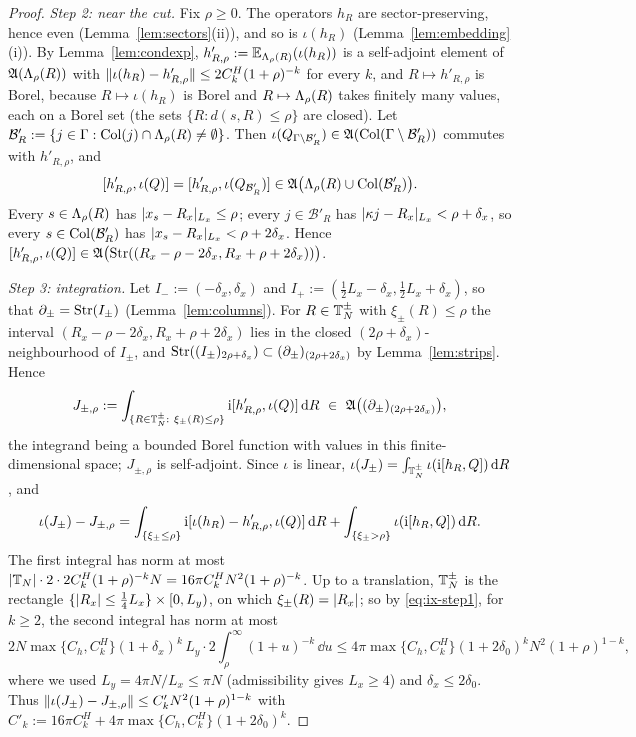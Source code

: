 \begin{proof}
\emph{Step 2: near the cut.} Fix $\rho\ge0$. The operators $h_R$ are sector-preserving, hence even
(Lemma~\ref{lem:sectors}(ii)), and so is $\iota(h_R)$ (Lemma~\ref{lem:embedding}(i)). By Lemma~\ref{lem:condexp},
$h'_{R,\rho}:=\mathbb{E}_{\Lambda_{\rho}(R)}(\iota(h_R))$ is a self-adjoint element of $\mathfrak{A}(\Lambda_{\rho}(R))$ with
$\lVert\iota(h_R)-h'_{R,\rho}\rVert\le2C^H_k(1+\rho)^{-k}$ for every $k$, and $R\mapsto h'_{R,\rho}$ is Borel, because
$R\mapsto\iota(h_R)$ is Borel and $R\mapsto\Lambda_{\rho}(R)$ takes finitely many values, each on a Borel set (the sets
$\{R:d(s,R)\le\rho\}$ are closed). Let $\mathcal B'_R:=\{j\in\Gamma:\mathrm{Col}(j)\cap\Lambda_{\rho}(R)\ne\emptyset\}$. Then
$\iota(Q_{\Gamma\setminus\mathcal B'_R})\in\mathfrak{A}(\mathrm{Col}(\Gamma\setminus\mathcal B'_R))$ commutes with $h'_{R,\rho}$, and
\[
[h'_{R,\rho},\iota(Q)]=[h'_{R,\rho},\iota(Q_{\mathcal B'_R})]\in\mathfrak{A}\bigl(\Lambda_{\rho}(R)\cup\mathrm{Col}(\mathcal B'_R)\bigr).
\]
Every $s\in\Lambda_{\rho}(R)$ has $\lvert x_s-R_x\rvert_{L_x}\le\rho$; every $j\in\mathcal B'_R$ has $\lvert\kappa j-R_x\rvert_{L_x}<\rho+\delta_x$,
so every $s\in\mathrm{Col}(\mathcal B'_R)$ has $\lvert x_s-R_x\rvert_{L_x}<\rho+2\delta_x$. Hence
$[h'_{R,\rho},\iota(Q)]\in\mathfrak{A}\bigl(\mathrm{Str}((R_x-\rho-2\delta_x,R_x+\rho+2\delta_x))\bigr)$.

\emph{Step 3: integration.} Let $I_-:=(-\delta_x,\delta_x)$ and $I_+:=(\frac12L_x-\delta_x,\frac12L_x+\delta_x)$, so that
$\partial_\pm=\mathrm{Str}(I_\pm)$ (Lemma~\ref{lem:columns}). For $R\in\mathbb{T}_N^\pm$ with $\xi_\pm(R)\le\rho$ the interval
$(R_x-\rho-2\delta_x,R_x+\rho+2\delta_x)$ lies in the closed $(2\rho+\delta_x)$-neighbourhood of $I_\pm$, and
$\mathrm{Str}((I_\pm)_{2\rho+\delta_x})\subset(\partial_\pm)_{(2\rho+2\delta_x)}$ by Lemma~\ref{lem:strips}. Hence
\[
J_{\pm,\rho}:=\int_{\{R\in\Tor_N^\pm:\ \xi_\pm(R)\le\rho\}}\iu[h'_{R,\rho},\iota(Q)]\,\dd R\ \in\ \Alg\bigl(\fat{(\partial_\pm)}{2\rho+2\delta_x}\bigr),
\]
the integrand being a bounded Borel function with values in this finite-dimensional space; $J_{\pm,\rho}$ is
self-adjoint. Since $\iota$ is linear, $\iota(J_\pm)=\int_{\mathbb{T}_N^\pm}\iota(\mathrm{i}[h_R,Q])\,\mathrm{d} R$, and
\[
\iota(J_\pm)-J_{\pm,\rho}=\int_{\{\xi_\pm\le\rho\}}\mathrm{i}[\iota(h_R)-h'_{R,\rho},\iota(Q)]\,\mathrm{d} R
+\int_{\{\xi_\pm>\rho\}}\iota(\mathrm{i}[h_R,Q])\,\mathrm{d} R .
\]
The first integral has norm at most $\lvert\mathbb{T}_N\rvert\cdot2\cdot2C^H_k(1+\rho)^{-k}N=16\pi C^H_kN^2(1+\rho)^{-k}$. Up to a
translation, $\mathbb{T}_N^\pm$ is the rectangle $\{\lvert R_x\rvert\le\frac14L_x\}\times[0,L_y)$, on which $\xi_\pm(R)=\lvert R_x\rvert$; so by
\eqref{eq:ix-step1}, for $k\ge2$, the second integral has norm at most
\[
2N\max\{C_h,C^H_k\}(1+\delta_x)^k\,L_y\cdot2\int_\rho^\infty(1+u)^{-k}\,\dd u
\le4\pi\max\{C_h,C^H_k\}(1+2\delta_0)^kN^2(1+\rho)^{1-k},
\]
where we used $L_y=4\pi N/L_x\le\pi N$ (admissibility gives $L_x\ge4$) and $\delta_x\le2\delta_0$. Thus
$\lVert\iota(J_\pm)-J_{\pm,\rho}\rVert\le C'_kN^2(1+\rho)^{1-k}$ with $C'_k:=16\pi C^H_k+4\pi\max\{C_h,C^H_k\}(1+2\delta_0)^k$.


\end{proof}
